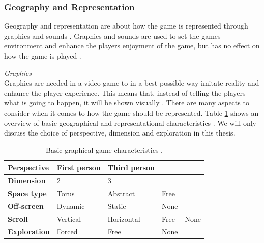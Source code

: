 \subsubsection{Geography and Representation}
\label{sec:georep}
Geography and representation are about how the game is represented through graphics and sounds \cite{understandingvg}. Graphics and sounds are used to set the games environment and enhance the players enjoyment of the game, but has no effect on how the game is played \cite{umlapproach}.  

\emph{Graphics}\\
Graphics are needed in a video game to in a best possible way imitate reality and enhance the player experience. This means that, instead of telling the players what is going to happen, it will be shown visually \cite{umlapproach}.
There are many aspects to consider when it comes to how the game should be represented. Table \ref{tab:graphic} shows an overview of basic geographical and representational characteristics \cite{understandingvg}. We will only discuss the choice of perspective, dimension and exploration in this thesis. 

\begin{table}
\centering
    \begin{tabular}{|l|l|l|l|l|}
        \hline
       \textbf{Perspective} & First person & Third person & &  \\ \hline
       \textbf{Dimension} & 2 & 3 & & \\ \hline
       \textbf{Space type} & Torus & Abstract & Free & \\ \hline
	   \textbf{Off-screen} & Dynamic & Static & None & \\ \hline
	   \textbf{Scroll} & Vertical & Horizontal & Free & None \\ \hline
	   \textbf{Exploration} & Forced & Free & None & \\
        \hline
    \end{tabular}
    \caption[Graphical Characteristics]{Basic graphical game characteristics \cite{understandingvg}.}
    \label{tab:graphic}
\end{table} 

